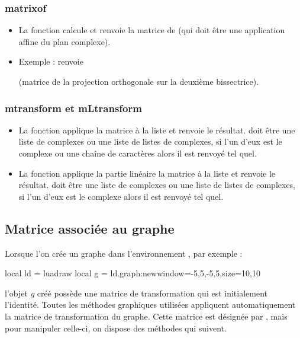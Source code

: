 \subsubsection{matrixof}
\begin{itemize}
    \item La fonction  calcule et renvoie la matrice de  (qui doit être une application affine du plan complexe).
    \item Exemple :  renvoie \par
      (matrice de la projection orthogonale sur la deuxième bissectrice).
\end{itemize}

\subsubsection{mtransform et mLtransform}
\begin{itemize}
    \item La fonction  applique la matrice  à la liste  et renvoie le résultat.  doit être une liste de complexes ou une liste de listes de complexes, si l'un d'eux est le complexe  ou une chaîne de caractères alors il est renvoyé tel quel.
    
    \item La fonction  applique la partie linéaire la matrice  à la liste  et renvoie le résultat.  doit être une liste de complexes ou une liste de listes de complexes, si l'un d'eux est le complexe  alors il est renvoyé tel quel.
\end{itemize}

\subsection{Matrice associée au graphe}

Lorsque l'on crée un graphe dans l'environnement \luadrawenv, par exemple :
\begin{Luacode}
local ld = luadraw
local g = ld.graph:new{window={-5,5,-5,5},size={10,10}}
\end{Luacode}
l'objet \emph{g} créé possède une matrice de transformation qui est initialement l'identité. Toutes les méthodes graphiques utilisées appliquent automatiquement la matrice de transformation du graphe. Cette matrice est désignée par , mais pour manipuler celle-ci, on dispose des méthodes qui suivent.

